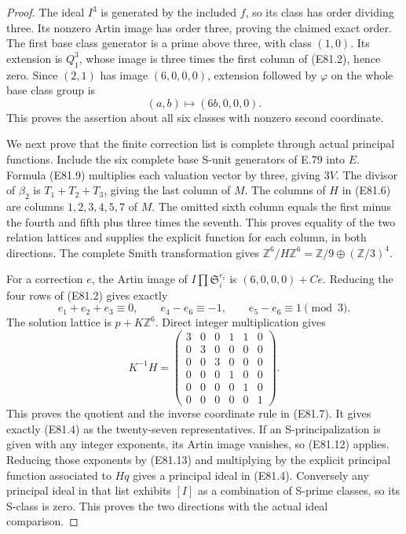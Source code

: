 \begin{proof}
The ideal $I^3$ is generated by the included $f$, so
its class has order dividing three. Its nonzero Artin
image has order three, proving the claimed exact
order. The first base class generator is a prime
above three, with class $(1,0)$. Its extension is
$Q_1^3$, whose image is three times the first column
of (E81.2), hence zero. Since $(2,1)$ has image
$(6,0,0,0)$, extension followed by $\varphi$ on the
whole base class group is
\[
 (a,b)\longmapsto(6b,0,0,0).
 \tag{E81.11}
\]
This proves the assertion about all six classes with
nonzero second coordinate.

We next prove that the finite correction list is
complete through actual principal functions. Include
the six complete base S-unit generators of E.79 into
$E$. Formula (E81.9) multiplies each valuation vector
by three, giving $3V$. The divisor of $\beta_2$ is
$T_1+T_2+T_3$, giving the last column of $M$.
The columns of $H$ in (E81.6) are columns
$1,2,3,4,5,7$ of $M$. The omitted sixth column equals
the first minus the fourth and fifth plus three
times the seventh. This proves equality of the
two relation lattices and supplies the explicit
function for each column, in both directions.
The complete Smith transformation gives
$\mathbb Z^6/H\mathbb Z^6=
\mathbb Z/9\oplus(\mathbb Z/3)^4$.

For a correction $e$, the Artin image of
$I\prod\mathfrak S_i^{e_i}$ is
$(6,0,0,0)+Ce$. Reducing the four rows of (E81.2)
gives exactly
\[
 e_1+e_2+e_3\equiv0,\qquad
 e_4-e_6\equiv-1,\qquad
 e_5-e_6\equiv1\pmod3.
 \tag{E81.12}
\]
The solution lattice is $p+K\mathbb Z^6$. Direct
integer multiplication gives
\[
 K^{-1}H=
 \begin{pmatrix}
 3&0&0&1&1&0\\0&3&0&0&0&0\\0&0&3&0&0&0\\
 0&0&0&1&0&0\\0&0&0&0&1&0\\0&0&0&0&0&1
 \end{pmatrix}.
 \tag{E81.13}
\]
This proves the quotient and the inverse coordinate
rule in (E81.7). It gives exactly (E81.4) as the
twenty-seven representatives. If an S-principalization
is given with any integer exponents, its Artin image
vanishes, so (E81.12) applies. Reducing those exponents
by (E81.13) and multiplying by the explicit principal
function associated to $Hq$ gives a principal ideal
in (E81.4). Conversely any principal ideal in that
list exhibits $[I]$ as a combination of S-prime
classes, so its S-class is zero. This proves the
two directions with the actual ideal comparison.


\end{proof}
